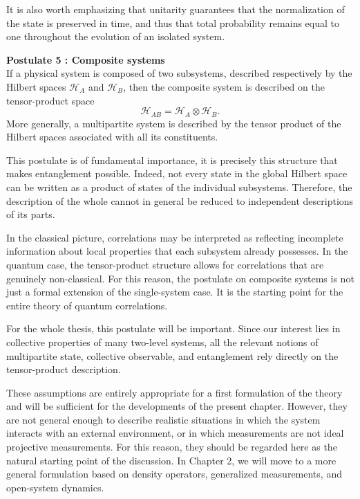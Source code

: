 It is also worth emphasizing that unitarity guarantees that the normalization of the state is preserved in time, and thus that total probability remains equal to one throughout the evolution of an isolated system.

\medskip

\textbf{Postulate 5 : Composite systems}
\\
If a physical system is composed of two subsystems, described respectively by the Hilbert spaces $\mathcal{H}_A$ and $\mathcal{H}_B$, then the composite system is described on the tensor-product space
\begin{equation}
	\mathcal{H}_{AB}=\mathcal{H}_A\otimes\mathcal{H}_B.
	\label{eq:intro_qm_tensor_product_space}
\end{equation}
More generally, a multipartite system is described by the tensor product of the Hilbert spaces associated with all its constituents.

This postulate is of fundamental importance, it is precisely this structure that makes entanglement possible. Indeed, not every state in the global Hilbert space can be written as a product of states of the individual subsystems. Therefore, the description of the whole cannot in general be reduced to independent descriptions of its parts.

In the classical picture, correlations may be interpreted as reflecting incomplete information about local properties that each subsystem already possesses. In the quantum case, the tensor-product structure allows for correlations that are genuinely non-classical. For this reason, the postulate on composite systems is not just a formal extension of the single-system case. It is the starting point for the entire theory of quantum correlations.

For the whole thesis, this postulate will be important. Since our interest lies in collective properties of many two-level systems, all the relevant notions of multipartite state, collective observable, and entanglement rely directly on the tensor-product description.



\medskip

These assumptions are entirely appropriate for a first formulation of the theory and will be sufficient for the developments of the present chapter. However, they are not general enough to describe realistic situations in which the system interacts with an external environment, or in which measurements are not ideal projective measurements. For this reason, they should be regarded here as the natural starting point of the discussion. In Chapter 2, we will move to a more general formulation based on density operators, generalized measurements, and open-system dynamics.

